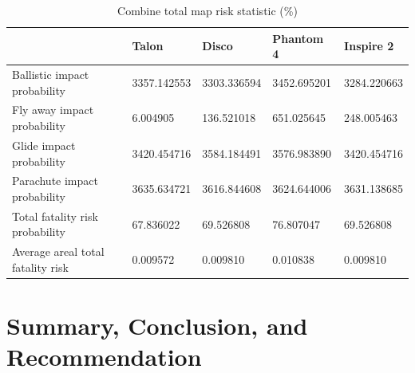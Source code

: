 \documentclass[12pt]{report}
\begin{document}
    \begin{table}[H]
        \centering
        \caption{Combine total map risk statistic (\%)} %
        \begin{tabular}{|lllll|}
            \hline
            \textbf{} & \textbf{Talon} & \textbf{Disco} & \textbf{Phantom 4} & \textbf{Inspire 2} \\
            \hline
            {Ballistic impact probability} & 3357.142553 & 3303.336594 & 3452.695201 & 3284.220663 \\
            {Fly away impact probability} & 6.004905 & 136.521018 & 651.025645 & 248.005463 \\
            {Glide impact probability} & 3420.454716 & 3584.184491 & 3576.983890 & 3420.454716 \\
            {Parachute impact probability} & 3635.634721 & 3616.844608 & 3624.644006 & 3631.138685 \\
            {Total fatality risk probability} & 67.836022 & 69.526808 & 76.807047 & 69.526808 \\
            {Average areal total fatality risk} & 0.009572 & 0.009810 & 0.010838 & 0.009810 \\
            \hline
        \end{tabular}
        \captionsetup{justification=justified} %
        \label{tab:total-map-risk}
    \end{table}


\chapter{Summary, Conclusion, and Recommendation}
\end{document}
